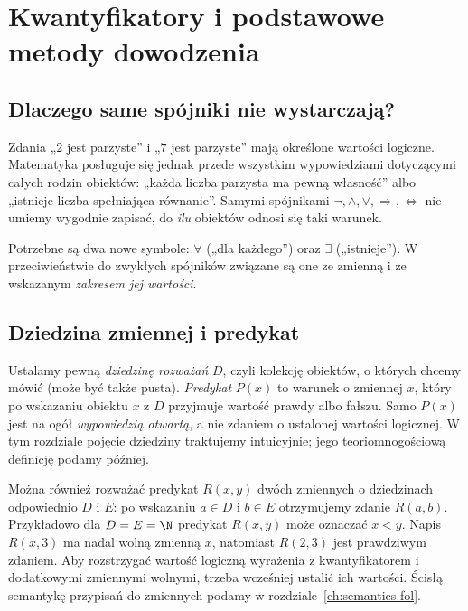 \chapter{Kwantyfikatory i podstawowe metody dowodzenia}\label{ch:quantifiers}

\section{Dlaczego same spójniki nie wystarczają?}\label{sec:quantifier-motivation}
Zdania „$2$ jest parzyste” i „$7$ jest parzyste” mają
określone wartości logiczne. Matematyka posługuje się jednak
przede wszystkim wypowiedziami dotyczącymi całych rodzin
obiektów: „każda liczba parzysta ma pewną własność” albo
„istnieje liczba spełniająca równanie”. Samymi spójnikami
$\neg,\land,\lor,\Rightarrow,\Leftrightarrow$ nie umiemy
wygodnie zapisać, do \emph{ilu} obiektów odnosi się taki warunek.

Potrzebne są dwa nowe symbole: $\forall$ („dla każdego”)
oraz $\exists$ („istnieje”). W przeciwieństwie do zwykłych
spójników związane są one ze zmienną i ze wskazanym
\emph{zakresem jej wartości}.

\section{Dziedzina zmiennej i predykat}\label{sec:predicates}
\begin{definicja}
\label{def:predicate}
Ustalamy pewną \emph{dziedzinę rozważań} $D$, czyli kolekcję
obiektów, o których chcemy mówić (może być także
pusta). \emph{Predykat} $P(x)$
to warunek o zmiennej $x$, który po wskazaniu obiektu
$x$ z $D$ przyjmuje wartość prawdy albo fałszu.
Samo $P(x)$ jest na ogół \emph{wypowiedzią otwartą},
a nie zdaniem o ustalonej wartości logicznej.
W tym rozdziale pojęcie dziedziny traktujemy intuicyjnie;
jego teoriomnogościową definicję podamy później.
\end{definicja}

\begin{uwaga}
\label{rem:predicates-arity-xli}
Można również rozważać predykat $R(x,y)$ dwóch zmiennych
o dziedzinach odpowiednio $D$ i $E$: po wskazaniu
$a\in D$ i $b\in E$ otrzymujemy zdanie $R(a,b)$.
Przykładowo dla $D=E=\N$ predykat $R(x,y)$ może
oznaczać $x<y$. Napis $R(x,3)$ ma nadal wolną
zmienną $x$, natomiast $R(2,3)$ jest prawdziwym
zdaniem. Aby rozstrzygać wartość logiczną wyrażenia
z kwantyfikatorem i dodatkowymi zmiennymi wolnymi,
trzeba wcześniej ustalić ich wartości.
Ścisłą semantykę przypisań do zmiennych podamy w
rozdziale~\ref{ch:semantics-fol}.
\end{uwaga}

